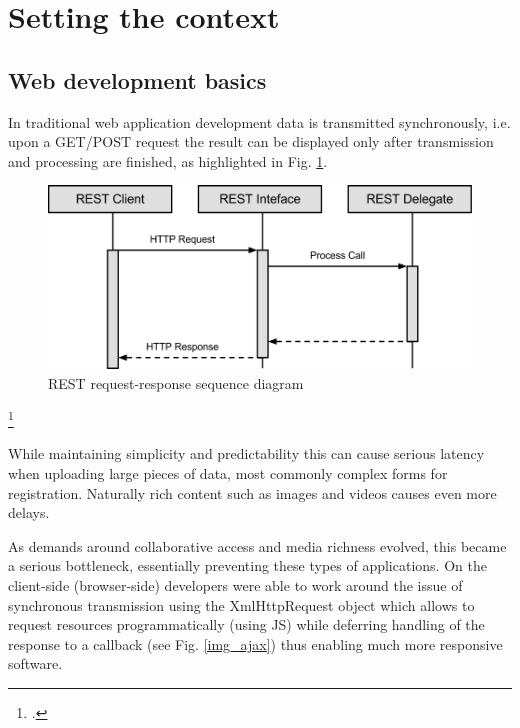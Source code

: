 \newpage
\section{Setting the context}
\label{setting_the_context}
\subsection{Web development basics}

In traditional web application development data is transmitted synchronously,
i.e. upon a GET/POST request the result can be displayed only after transmission
and processing are finished, as highlighted in Fig. \ref{img_req_res}.

\begin{figure}[hbtp]
\centering
\includegraphics[scale=0.75]{img/rest_call.png}
\caption[REST request-response sequence diagram]{REST request-response sequence diagram\footnotemark\label{img_req_res}}
\end{figure}
\footcitetext{req_res}

While maintaining simplicity and
predictability this can cause serious latency when uploading large pieces of
data, most commonly complex forms for registration. Naturally rich content such
as images and videos causes even more delays.

As demands around collaborative access and media richness evolved, this became a
serious bottleneck, essentially preventing these types of applications. On the
client-side (browser-side) developers were able to work around the issue of
synchronous transmission using the XmlHttpRequest object which allows to request
resources programmatically (using JS) while
deferring handling of the response to a callback (see Fig. \ref{img_ajax}) thus enabling much more responsive software.

